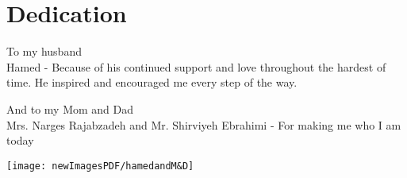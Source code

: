 \chapter*{Dedication}

To my husband \\
Hamed - Because of his continued support and love throughout the hardest of time. He inspired and encouraged me every step of the way.

And to my Mom and Dad \\
Mrs. Narges Rajabzadeh and Mr. Shirviyeh Ebrahimi - For making me who I am today

\begin{figure*}
	\begin{center}
		\texttt{[image: newImagesPDF/hamedandM\&D]}
	\end{center}
\end{figure*}